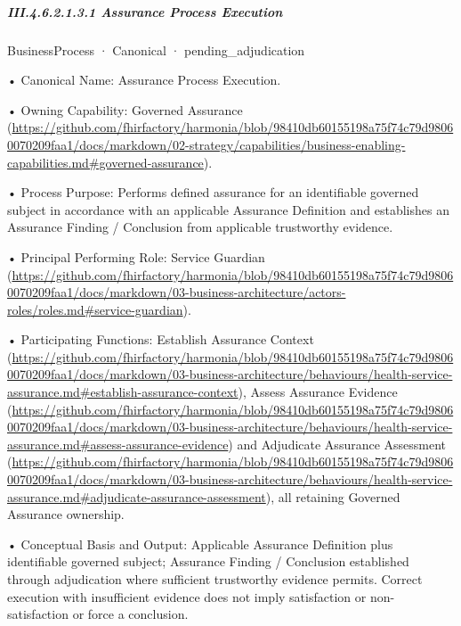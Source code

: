 \subparagraph*{III.4.6.2.1.3.1 Assurance Process Execution}
\label{navigation:III.4.6.2.1.3.1}

\label{element:3c67e57403b041bb8ccdaf3980b6ff94}
{\small BusinessProcess · Canonical · pending\_adjudication}\par

•
Canonical Name: Assurance Process Execution.



•
Owning Capability: Governed Assurance (\url{https://github.com/fhirfactory/harmonia/blob/98410db60155198a75f74c79d98060070209faa1/docs/markdown/02-strategy/capabilities/business-enabling-capabilities.md#governed-assurance}).



•
Process Purpose: Performs defined assurance for an identifiable governed subject in accordance with an applicable Assurance Definition and establishes an Assurance Finding / Conclusion from applicable trustworthy evidence.



•
Principal Performing Role: Service Guardian (\url{https://github.com/fhirfactory/harmonia/blob/98410db60155198a75f74c79d98060070209faa1/docs/markdown/03-business-architecture/actors-roles/roles.md#service-guardian}).



•
Participating Functions: Establish Assurance Context (\url{https://github.com/fhirfactory/harmonia/blob/98410db60155198a75f74c79d98060070209faa1/docs/markdown/03-business-architecture/behaviours/health-service-assurance.md#establish-assurance-context}), Assess Assurance Evidence (\url{https://github.com/fhirfactory/harmonia/blob/98410db60155198a75f74c79d98060070209faa1/docs/markdown/03-business-architecture/behaviours/health-service-assurance.md#assess-assurance-evidence}) and Adjudicate Assurance Assessment (\url{https://github.com/fhirfactory/harmonia/blob/98410db60155198a75f74c79d98060070209faa1/docs/markdown/03-business-architecture/behaviours/health-service-assurance.md#adjudicate-assurance-assessment}), all retaining Governed Assurance ownership.



•
Conceptual Basis and Output: Applicable Assurance Definition plus identifiable governed subject; Assurance Finding / Conclusion established through adjudication where sufficient trustworthy evidence permits. Correct execution with insufficient evidence does not imply satisfaction or non-satisfaction or force a conclusion.



